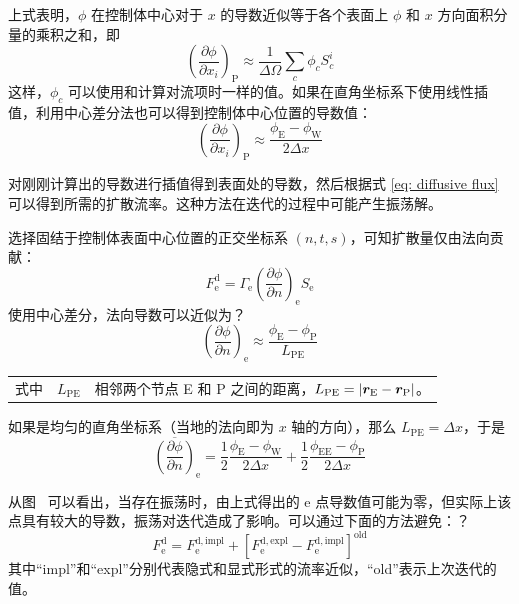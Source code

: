 上式表明，$\phi$ 在控制体中心对于 $x$ 的导数近似等于各个表面上 $\phi$ 和 $x$ 方向面积分量的乘积之和，即
\begin{equation}
	\left(\frac{\partial\phi}{\partial x_i}\right)_{\mathrm{P}} \approx
	\frac{1}{\Delta\varOmega}\sum_c\phi_c S_c^i
\end{equation}
这样，$\phi_c$ 可以使用和计算对流项时一样的值。如果在直角坐标系下使用线性插值，利用中心差分法也可以得到控制体中心位置的导数值：
\begin{equation}
	\left(\frac{\partial\phi}{\partial x_i}\right)_{\mathrm{P}} \approx
	\frac{\phi_{\mathrm{E}}-\phi_{\mathrm{W}}}{2\Delta x}
\end{equation}

对刚刚计算出的导数进行插值得到表面处的导数，然后根据式 \eqref{eq: diffusive flux} 可以得到所需的扩散流率。这种方法在迭代的过程中可能产生振荡解。

选择固结于控制体表面中心位置的正交坐标系 $(n,t,s)$，可知扩散量仅由法向贡献：
\begin{equation}\label{eq: diffusive flux of local coordinate}
	F_{\mathrm{e}}^{\mathrm{d}} = \varGamma_{\mathrm{e}}\left(\frac{\partial\phi}{\partial n}\right)_{\mathrm{e}}S_{\mathrm{e}}
\end{equation}
使用中心差分，法向导数可以近似为？
\begin{equation}
	\left(\frac{\partial\phi}{\partial n}\right)_{\mathrm{e}} \approx
	\frac{\phi_{\mathrm{E}}-\phi_{\mathrm{P}}}{L_{\mathrm{PE}}}
\end{equation}
\begin{tabularx}{\textwidth}{@{}l@{\quad}r@{——}X@{}}
	式中 & $L_{\mathrm{PE}}$ & 相邻两个节点 E 和 P 之间的距离，$L_{\mathrm{PE}} = \lvert\bm{r}_{\mathrm{E}}-\bm{r}_{\mathrm{P}}\vert$。
\end{tabularx}\vspace{3.15bp}
如果是均匀的直角坐标系（当地的法向即为 $x$ 轴的方向），那么 $L_{\mathrm{PE}}=\Delta x$，于是
\begin{equation}
	\overline{\left(\frac{\partial\phi}{\partial n}\right)}_{\mathrm{e}} =
	\frac12\frac{\phi_{\mathrm{E}}-\phi_{\mathrm{W}}}{2\Delta x} +
	\frac12\frac{\phi_{\mathrm{EE}}-\phi_{\mathrm{P}}}{2\Delta x}
\end{equation}

从图~ 可以看出，当存在振荡时，由上式得出的 e 点导数值可能为零，但实际上该点具有较大的导数，振荡对迭代造成了影响。可以通过下面的方法避免：？
\begin{equation}
	F_{\mathrm{e}}^{\mathrm{d}} = F_{\mathrm{e}}^{\mathrm{d,impl}} +
	[F_{\mathrm{e}}^{\mathrm{d,expl}} - F_{\mathrm{e}}^{\mathrm{d,impl}}]^{\mathrm{old}}
\end{equation}
其中“impl”和“expl”分别代表隐式和显式形式的流率近似，“old”表示上次迭代的值。

